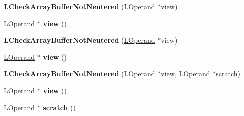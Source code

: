 \begin{DoxyCompactItemize}
\item 
{\bfseries L\+Check\+Array\+Buffer\+Not\+Neutered} (\hyperlink{classv8_1_1internal_1_1_l_operand}{L\+Operand} $\ast$view)\hypertarget{classv8_1_1internal_1_1_l_check_array_buffer_not_neutered_addcdc3d86f712547d0a60295021d30d8}{}\label{classv8_1_1internal_1_1_l_check_array_buffer_not_neutered_addcdc3d86f712547d0a60295021d30d8}

\item 
\hyperlink{classv8_1_1internal_1_1_l_operand}{L\+Operand} $\ast$ {\bfseries view} ()\hypertarget{classv8_1_1internal_1_1_l_check_array_buffer_not_neutered_a63ed2c0c10f578779102ed69f6ab5765}{}\label{classv8_1_1internal_1_1_l_check_array_buffer_not_neutered_a63ed2c0c10f578779102ed69f6ab5765}

\item 
{\bfseries L\+Check\+Array\+Buffer\+Not\+Neutered} (\hyperlink{classv8_1_1internal_1_1_l_operand}{L\+Operand} $\ast$view)\hypertarget{classv8_1_1internal_1_1_l_check_array_buffer_not_neutered_addcdc3d86f712547d0a60295021d30d8}{}\label{classv8_1_1internal_1_1_l_check_array_buffer_not_neutered_addcdc3d86f712547d0a60295021d30d8}

\item 
\hyperlink{classv8_1_1internal_1_1_l_operand}{L\+Operand} $\ast$ {\bfseries view} ()\hypertarget{classv8_1_1internal_1_1_l_check_array_buffer_not_neutered_a63ed2c0c10f578779102ed69f6ab5765}{}\label{classv8_1_1internal_1_1_l_check_array_buffer_not_neutered_a63ed2c0c10f578779102ed69f6ab5765}

\item 
{\bfseries L\+Check\+Array\+Buffer\+Not\+Neutered} (\hyperlink{classv8_1_1internal_1_1_l_operand}{L\+Operand} $\ast$view, \hyperlink{classv8_1_1internal_1_1_l_operand}{L\+Operand} $\ast$scratch)\hypertarget{classv8_1_1internal_1_1_l_check_array_buffer_not_neutered_a24b5548a92c5cdf4029ad5bfc565f992}{}\label{classv8_1_1internal_1_1_l_check_array_buffer_not_neutered_a24b5548a92c5cdf4029ad5bfc565f992}

\item 
\hyperlink{classv8_1_1internal_1_1_l_operand}{L\+Operand} $\ast$ {\bfseries view} ()\hypertarget{classv8_1_1internal_1_1_l_check_array_buffer_not_neutered_a63ed2c0c10f578779102ed69f6ab5765}{}\label{classv8_1_1internal_1_1_l_check_array_buffer_not_neutered_a63ed2c0c10f578779102ed69f6ab5765}

\item 
\hyperlink{classv8_1_1internal_1_1_l_operand}{L\+Operand} $\ast$ {\bfseries scratch} ()\hypertarget{classv8_1_1internal_1_1_l_check_array_buffer_not_neutered_abe3f24316b6f984fe8c419265442c758}{}\label{classv8_1_1internal_1_1_l_check_array_buffer_not_neutered_abe3f24316b6f984fe8c419265442c758}

\end{DoxyCompactItemize}
